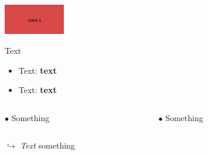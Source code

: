 \begin{frame}
  \begin{center}
      \pause[8]
      \includegraphics[width=0.2\textwidth]{logo1.jpg}
  \end{center}
\end{frame}

\begin{frame}
    \pause\alert{Text}

    \vspace{0.6cm}

    \begin{itemize}
      \item<3-> Text: \textbf{text}
      \item<4-> Text: \textbf{text}
    \end{itemize}

    \vspace{0.6cm}

    \pause[5]
    \begin{columns}[c]
        \begin{column}{3cm}
          $\bullet$ Something
        \end{column}

        \begin{column}{3cm}
          $\bullet$ Something
        \end{column}
    \end{columns}

    \vspace{0.6cm}

    \pause[6]
    $\hookrightarrow$ \textit{Text} something
\end{frame}

